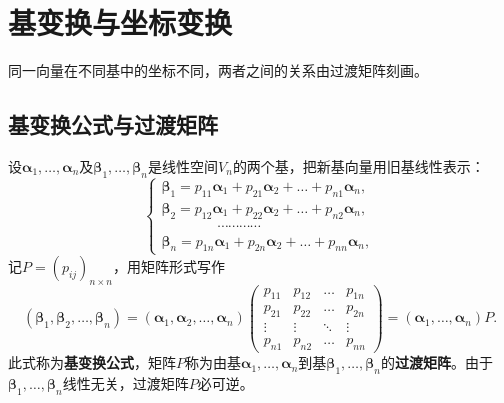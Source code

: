 
\section{基变换与坐标变换}

同一向量在不同基中的坐标不同，两者之间的关系由过渡矩阵刻画。

\subsection{基变换公式与过渡矩阵}
设$\boldsymbol{\alpha}_1,\dots,\boldsymbol{\alpha}_n$及$\boldsymbol{\beta}_1,\dots,\boldsymbol{\beta}_n$是线性空间$V_n$的两个基，把新基向量用旧基线性表示：
\[
\begin{cases}
\boldsymbol{\beta}_1=p_{11}\boldsymbol{\alpha}_1+p_{21}\boldsymbol{\alpha}_2+\dots+p_{n1}\boldsymbol{\alpha}_n,\\
\boldsymbol{\beta}_2=p_{12}\boldsymbol{\alpha}_1+p_{22}\boldsymbol{\alpha}_2+\dots+p_{n2}\boldsymbol{\alpha}_n,\\
\qquad\qquad\cdots\cdots\cdots\cdots\\
\boldsymbol{\beta}_n=p_{1n}\boldsymbol{\alpha}_1+p_{2n}\boldsymbol{\alpha}_2+\dots+p_{nn}\boldsymbol{\alpha}_n,
\end{cases}
\]
记$P=(p_{ij})_{n\times n}$，用矩阵形式写作
\[
(\boldsymbol{\beta}_1,\boldsymbol{\beta}_2,\dots,\boldsymbol{\beta}_n)
=(\boldsymbol{\alpha}_1,\boldsymbol{\alpha}_2,\dots,\boldsymbol{\alpha}_n)
\begin{pmatrix}p_{11}&p_{12}&\dots&p_{1n}\\p_{21}&p_{22}&\dots&p_{2n}\\\vdots&\vdots&\ddots&\vdots\\p_{n1}&p_{n2}&\dots&p_{nn}\end{pmatrix}
=(\boldsymbol{\alpha}_1,\dots,\boldsymbol{\alpha}_n)P .
\]
此式称为\textbf{基变换公式}，矩阵$P$称为由基$\boldsymbol{\alpha}_1,\dots,\boldsymbol{\alpha}_n$到基$\boldsymbol{\beta}_1,\dots,\boldsymbol{\beta}_n$的\textbf{过渡矩阵}。由于$\boldsymbol{\beta}_1,\dots,\boldsymbol{\beta}_n$线性无关，过渡矩阵$P$必可逆。

